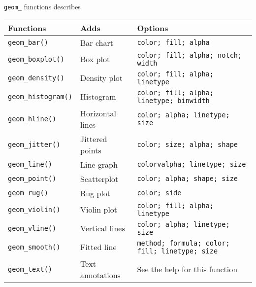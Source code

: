     \lstinline|geom_| functions describes
\begin{table}[H]
    \centering
      \begin{tabular}{l|l|l}
        \hline
      Functions  & Adds  & Options \\
      \hline
      \lstinline|geom_bar()|  & Bar chart  & \lstinline|color; fill; alpha | \\
      \lstinline|geom_boxplot()|  & Box plot  & \lstinline|color; fill; alpha; notch; width | \\
      \lstinline|geom_density()|  & Density plot  & \lstinline|color; fill; alpha; linetype | \\
      \lstinline|geom_histogram()|  & Histogram  & \lstinline|color; fill; alpha; linetype; binwidth | \\
      \lstinline|geom_hline()|  & Horizontal lines  & \lstinline|color; alpha; linetype; size | \\
      \lstinline|geom_jitter()|  & Jittered points  & \lstinline|color; size; alpha; shape | \\
      \lstinline|geom_line()|  & Line graph  & \lstinline|colorvalpha; linetype; size | \\
      \lstinline|geom_point()|  & Scatterplot  & \lstinline|color; alpha; shape; size | \\
      \lstinline|geom_rug()|  & Rug plot  & \lstinline|color; side | \\
      \lstinline|geom_violin()|  & Violin plot  & \lstinline|color; fill; alpha; linetype | \\
      \lstinline|geom_vline()|  & Vertical lines  & \lstinline|color; alpha; linetype; size | \\
      \hline
      \lstinline|geom_smooth()|  & Fitted line  & \lstinline|method; formula; color; fill; linetype; size | \\
      \lstinline|geom_text()|  & Text annotations & See the help for this function \\
      \hline
      \end{tabular}
  \end{table}
  
